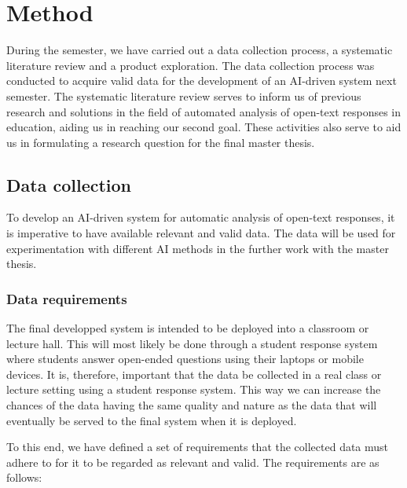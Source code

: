 \chapter{Method}\label{chap:method}

\begin{comment}
The method chapter should describe in detail which activities you undertake to answer the research questions presented in the introduction, and why they were chosen. This includes detailed descriptions of experiments, surveys, computations, data analysis, statistical tests etc.

Talk about the data used, and why we collected our own
\end{comment}

During the semester, we have carried out a data collection process, a systematic literature review and a product exploration. The data collection process was conducted to acquire valid data for the development of an AI-driven system next semester. The systematic literature review serves to inform us of previous research and solutions in the field of automated analysis of open-text responses in education, aiding us in reaching our second goal. These activities also serve to aid us in formulating a research question for the final master thesis.


\section{Data collection}
To develop an AI-driven system for automatic analysis of open-text responses, it is imperative to have available relevant and valid data. The data will be used for experimentation with different AI methods in the further work with the master thesis.

\subsection{Data requirements}
The final developped system is intended to be deployed into a classroom or lecture hall. This will most likely be done through a student response system where students answer open-ended questions using their laptops or mobile devices. It is, therefore, important that the data be collected in a real class or lecture setting using a student response system. This way we can increase the chances of the data having the same quality and nature as the data that will eventually be served to the final system when it is deployed.

To this end, we have defined a set of requirements that the collected data must adhere to for it to be regarded as relevant and valid. The requirements are as follows:

